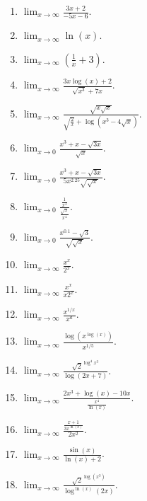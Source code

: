 \documentclass[9pt]{article}
\newcommand{\D}{\displaystyle}
\begin{document}
\begin{enumerate}
         \begin{enumerate}
            \item $\D\lim_{x \rightarrow \infty} \frac{3x + 2}{-5x - 6}$.
            \item $\D\lim_{x \rightarrow \infty} \ln(x)$.
            \item $\D\lim_{x \rightarrow \infty} \left(\frac{1}{x} + 3\right)$.
            \item $\D\lim_{x \rightarrow \infty}
                     \frac{3x\log(x)+ 2}{\sqrt{x^3} + 7x}$.
            \item $\D\lim_{x \rightarrow \infty}
                     \frac{\sqrt{x\sqrt{x}}}{\sqrt{\D\frac{2}{x}} +
                     \log(x^3 - 4\sqrt{x})}$.
            \item $\D\lim_{x \rightarrow 0}
                   \frac{x^3 + x - \sqrt{3x}}{\sqrt{x}}$.
            \item $\D\lim_{x \rightarrow 0}
                   \frac{x^3 + x - \sqrt{3x}}{5x^{2.25}\sqrt{\sqrt{x}}}$.
            \item $\D\lim_{x \rightarrow 0}
                   \frac{\D\frac{1}{x^3}}{\D\frac{\sqrt{x}}{x^4}}$.
            \item $\D\lim_{x \rightarrow 0}
                   \frac{x^{0.1} - \sqrt{3}}{\sqrt{\sqrt{x}}}$.
            \item $\D\lim_{x \rightarrow \infty}\frac{x^x}{2^x}$.
            \item $\D\lim_{x \rightarrow \infty}\frac{x^x}{x2^x}$.
            \item $\D\lim_{x \rightarrow \infty}\frac{x^{1/x}}{x^a}$.
            \item $\D\lim_{x \rightarrow \infty}
                     \frac{\log(x^{\log(x)})}{x^{1/5}}$.
            \item $\D\lim_{x \rightarrow \infty}
                     \frac{\sqrt{2}^{\log^4x^3}}{\log(2x+7)}$.
            \item $\D\lim_{x \rightarrow \infty}\frac{2x^3 + \log(x) - 10x}
                     {\D\frac{x^4}{\ln(x)}}$.
            \item $\D\lim_{x \rightarrow \infty}
                     \frac{\D\frac{x+1}{3x^{\ln(x)}}}{2x^2}$.
            \item $\D\lim_{x \rightarrow \infty}\frac{\sin(x)}{\ln(x) + 2}$.
            \item $\D\lim_{x \rightarrow \infty}\frac{\sqrt{2}^{\log(x^3)}}
                     {\log^{\ln(x)}(2x)}$.
         \end{enumerate}
      

\end{enumerate}
\end{document}
